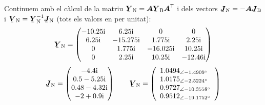 \begin{exemple}
    Continuem amb el càlcul de la matriu $\mcmplx{Y}\ped{N} =
    \boldsymbol{A} \mcmplx{Y}\ped{B} \transp{\boldsymbol{A}}$ i dels
    vectors $\mcmplx{J}\ped{N} = - \boldsymbol{A} \mcmplx{J}\ped{B}$ i
    $\mcmplx{V}\ped{N} = \mcmplx{Y}\ped{N}^{-1} \mcmplx{J}\ped{N}$ (tots
    els valors en per unitat):
    \[
       \mcmplx{Y}\ped{N} =
       \begin{pmatrix}
         \complexnum{-j 10,25} & \complexnum{j 6,25} & 0 & 0 \\
         \complexnum{j 6,25} & \complexnum{-j 15,275} & \complexnum{j 1,775} & \complexnum{j 2,25} \\
         0 & \complexnum{j 1,775 }& \complexnum{-j 16,025} & \complexnum{j 10,25} \\
         0 & \complexnum{j 2,25} & \complexnum{j 10,25} & \complexnum{-j 12,46}
       \end{pmatrix}
    \]
    \qquad
    \[
       \mcmplx{J}\ped{N} =
       \begin{pmatrix}
        \complexnum{-j 4,4} \\
        \complexnum{0,5 - j 5,25} \\
       \complexnum{ 0,48 - j 4,32} \\
        \complexnum{-2 + j 0,9}
       \end{pmatrix}
       \qquad
       \mcmplx{V}\ped{N} =
       \left(\begin{array}{l}
        \numpd{1,0494}{-1,4909} \\
        \numpd{1,0175}{-2,5224} \\
        \numpd{0,9727}{-10,3558} \\
        \numpd{0,9512}{-19,1752}
       \end{array}\right)
    \]


\end{exemple}
